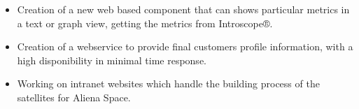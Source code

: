 \documentclass[10pt,a4paper]{altacv}
\begin{document}
\begin{itemize}
\item Creation of a new web based component that can shows particular metrics in a text or graph view, getting the metrics from Introscope®.
\end{itemize}
\divider

\begin{itemize}
\item Creation of a webservice to provide final customers profile information, with a high disponibility in minimal time response.
\end{itemize}
\divider

\begin{itemize}
\item Working on intranet websites which handle the building process of the satellites for Aliena Space.
\end{itemize}










\end{document}

